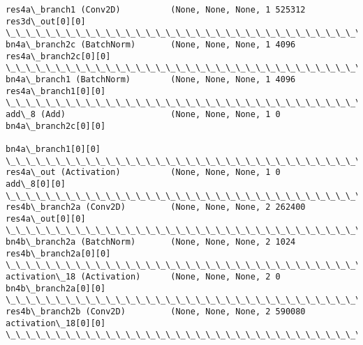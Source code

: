 \documentclass[11pt]{article}
\begin{document}
\begin{Verbatim}[commandchars=\\\{\}]
res4a\_branch1 (Conv2D)          (None, None, None, 1 525312      res3d\_out[0][0]                  
\_\_\_\_\_\_\_\_\_\_\_\_\_\_\_\_\_\_\_\_\_\_\_\_\_\_\_\_\_\_\_\_\_\_\_\_\_\_\_\_\_\_\_\_\_\_\_\_\_\_\_\_\_\_\_\_\_\_\_\_\_\_\_\_\_\_\_\_\_\_\_\_\_\_\_\_\_\_\_\_\_\_\_\_\_\_\_\_\_\_\_\_\_\_\_\_\_\_
bn4a\_branch2c (BatchNorm)       (None, None, None, 1 4096        res4a\_branch2c[0][0]             
\_\_\_\_\_\_\_\_\_\_\_\_\_\_\_\_\_\_\_\_\_\_\_\_\_\_\_\_\_\_\_\_\_\_\_\_\_\_\_\_\_\_\_\_\_\_\_\_\_\_\_\_\_\_\_\_\_\_\_\_\_\_\_\_\_\_\_\_\_\_\_\_\_\_\_\_\_\_\_\_\_\_\_\_\_\_\_\_\_\_\_\_\_\_\_\_\_\_
bn4a\_branch1 (BatchNorm)        (None, None, None, 1 4096        res4a\_branch1[0][0]              
\_\_\_\_\_\_\_\_\_\_\_\_\_\_\_\_\_\_\_\_\_\_\_\_\_\_\_\_\_\_\_\_\_\_\_\_\_\_\_\_\_\_\_\_\_\_\_\_\_\_\_\_\_\_\_\_\_\_\_\_\_\_\_\_\_\_\_\_\_\_\_\_\_\_\_\_\_\_\_\_\_\_\_\_\_\_\_\_\_\_\_\_\_\_\_\_\_\_
add\_8 (Add)                     (None, None, None, 1 0           bn4a\_branch2c[0][0]              
                                                                 bn4a\_branch1[0][0]               
\_\_\_\_\_\_\_\_\_\_\_\_\_\_\_\_\_\_\_\_\_\_\_\_\_\_\_\_\_\_\_\_\_\_\_\_\_\_\_\_\_\_\_\_\_\_\_\_\_\_\_\_\_\_\_\_\_\_\_\_\_\_\_\_\_\_\_\_\_\_\_\_\_\_\_\_\_\_\_\_\_\_\_\_\_\_\_\_\_\_\_\_\_\_\_\_\_\_
res4a\_out (Activation)          (None, None, None, 1 0           add\_8[0][0]                      
\_\_\_\_\_\_\_\_\_\_\_\_\_\_\_\_\_\_\_\_\_\_\_\_\_\_\_\_\_\_\_\_\_\_\_\_\_\_\_\_\_\_\_\_\_\_\_\_\_\_\_\_\_\_\_\_\_\_\_\_\_\_\_\_\_\_\_\_\_\_\_\_\_\_\_\_\_\_\_\_\_\_\_\_\_\_\_\_\_\_\_\_\_\_\_\_\_\_
res4b\_branch2a (Conv2D)         (None, None, None, 2 262400      res4a\_out[0][0]                  
\_\_\_\_\_\_\_\_\_\_\_\_\_\_\_\_\_\_\_\_\_\_\_\_\_\_\_\_\_\_\_\_\_\_\_\_\_\_\_\_\_\_\_\_\_\_\_\_\_\_\_\_\_\_\_\_\_\_\_\_\_\_\_\_\_\_\_\_\_\_\_\_\_\_\_\_\_\_\_\_\_\_\_\_\_\_\_\_\_\_\_\_\_\_\_\_\_\_
bn4b\_branch2a (BatchNorm)       (None, None, None, 2 1024        res4b\_branch2a[0][0]             
\_\_\_\_\_\_\_\_\_\_\_\_\_\_\_\_\_\_\_\_\_\_\_\_\_\_\_\_\_\_\_\_\_\_\_\_\_\_\_\_\_\_\_\_\_\_\_\_\_\_\_\_\_\_\_\_\_\_\_\_\_\_\_\_\_\_\_\_\_\_\_\_\_\_\_\_\_\_\_\_\_\_\_\_\_\_\_\_\_\_\_\_\_\_\_\_\_\_
activation\_18 (Activation)      (None, None, None, 2 0           bn4b\_branch2a[0][0]              
\_\_\_\_\_\_\_\_\_\_\_\_\_\_\_\_\_\_\_\_\_\_\_\_\_\_\_\_\_\_\_\_\_\_\_\_\_\_\_\_\_\_\_\_\_\_\_\_\_\_\_\_\_\_\_\_\_\_\_\_\_\_\_\_\_\_\_\_\_\_\_\_\_\_\_\_\_\_\_\_\_\_\_\_\_\_\_\_\_\_\_\_\_\_\_\_\_\_
res4b\_branch2b (Conv2D)         (None, None, None, 2 590080      activation\_18[0][0]              
\_\_\_\_\_\_\_\_\_\_\_\_\_\_\_\_\_\_\_\_\_\_\_\_\_\_\_\_\_\_\_\_\_\_\_\_\_\_\_\_\_\_\_\_\_\_\_\_\_\_\_\_\_\_\_\_\_\_\_\_\_\_\_\_\_\_\_\_\_\_\_\_\_\_\_\_\_\_\_\_\_\_\_\_\_\_\_\_\_\_\_\_\_\_\_\_\_\_

\end{Verbatim}
\end{document}
